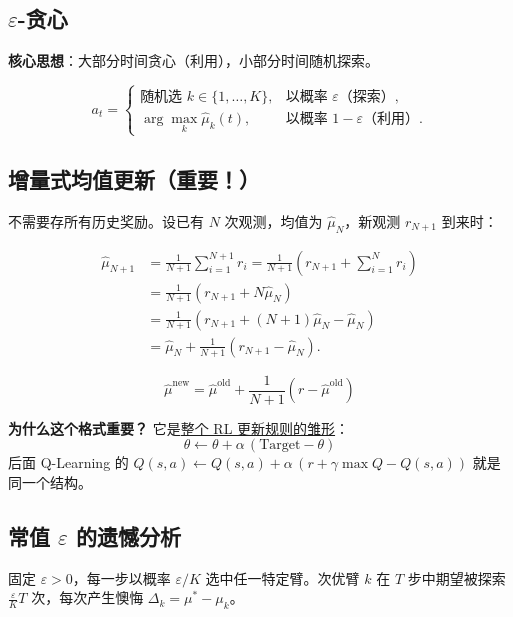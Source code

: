 \documentclass{article}
\begin{document}
\subsection*{$\varepsilon$-贪心}

\textbf{核心思想}：大部分时间贪心（利用），小部分时间随机探索。

\[
a_t = \begin{cases}
  \text{随机选 } k \in \{1,\ldots,K\}, & \text{以概率 } \varepsilon \text{（探索）},\\[4pt]
  \arg\max_k \hat{\mu}_k(t), & \text{以概率 } 1-\varepsilon \text{（利用）}.
\end{cases}
\]

\subsection*{增量式均值更新（重要！）}

不需要存所有历史奖励。设已有 $N$ 次观测，均值为 $\hat{\mu}_N$，新观测 $r_{N+1}$ 到来时：

\[
\begin{aligned}
\hat{\mu}_{N+1} &= \frac{1}{N+1}\sum_{i=1}^{N+1} r_i
                 = \frac{1}{N+1}\left(r_{N+1} + \sum_{i=1}^{N} r_i\right) \\[4pt]
                &= \frac{1}{N+1}\left(r_{N+1} + N\hat{\mu}_N\right) \\[4pt]
                &= \frac{1}{N+1}\left(r_{N+1} + (N+1)\hat{\mu}_N - \hat{\mu}_N\right) \\[4pt]
                &= \hat{\mu}_N + \frac{1}{N+1}\left(r_{N+1} - \hat{\mu}_N\right).
\end{aligned}
\]

\[
\boxed{\hat{\mu}^{\text{new}} = \hat{\mu}^{\text{old}} + \frac{1}{N+1}\left(r - \hat{\mu}^{\text{old}}\right)}
\]

\textbf{为什么这个格式重要？} 它是\underline{整个 RL 更新规则的雏形}：
\[
\theta \leftarrow \theta + \alpha\,(\text{Target} - \theta)
\]
后面 Q-Learning 的 $Q(s,a) \leftarrow Q(s,a) + \alpha\,(r + \gamma\max Q - Q(s,a))$ 就是同一个结构。

\subsection*{常值 $\varepsilon$ 的遗憾分析}

固定 $\varepsilon > 0$，每一步以概率 $\varepsilon/K$ 选中任一特定臂。次优臂 $k$ 在 $T$ 步中期望被探索 $\frac{\varepsilon}{K}T$ 次，每次产生懊悔 $\Delta_k = \mu^* - \mu_k$。
\end{document}
